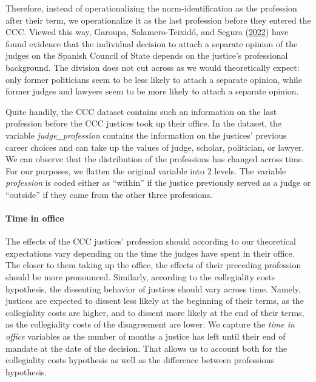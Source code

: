\documentclass[
  11pt,
]{article}
\begin{document}
Therefore, instead of operationalizing the norm-identification as the
profession after their term, we operationalize it as the last profession
before they entered the CCC. Viewed this way, Garoupa, Salamero-Teixidó,
and Segura
(\protect\hyperlink{ref-garoupaDisagreeingPrivateDissenting2022}{2022})
have found evidence that the individual decision to attach a separate
opinion of the judges on the Spanish Council of State depends on the
justice's professional background. The division does not cut across as
we would theoretically expect: only former politicians seem to be less
likely to attach a separate opinion, while former judges and lawyers
seem to be more likely to attach a separate opinion.

Quite handily, the CCC dataset contains such an information on the last
profession before the CCC justices took up their office. In the dataset,
the variable \emph{judge\_profession} contains the information on the
justices' previous career choices and can take up the values of judge,
scholar, politician, or lawyer. We can observe that the distribution of
the professions has changed across time. For our purposes, we flatten
the original variable into 2 levels. The variable \emph{profession} is
coded either as ``within'' if the justice previously served as a judge
or ``outside'' if they came from the other three professions.

\hypertarget{time-in-office}{%
\paragraph*{Time in office}\label{time-in-office}}

The effects of the CCC justices' profession should according to our
theoretical expectations vary depending on the time the judges have
spent in their office. The closer to them taking up the office, the
effects of their preceding profession should be more pronounced.
Similarly, according to the collegiality costs hypothesis, the
dissenting behavior of justices should vary across time. Namely,
justices are expected to dissent less likely at the beginning of their
terms, as the collegiality costs are higher, and to dissent more likely
at the end of their terms, as the collegiality costs of the disagreement
are lower. We capture the \emph{time in office} variables as the number
of months a justice has left until their end of mandate at the date of
the decision. That allows us to account both for the collegiality costs
hypothesis as well as the difference between professions hypothesis.
\end{document}
